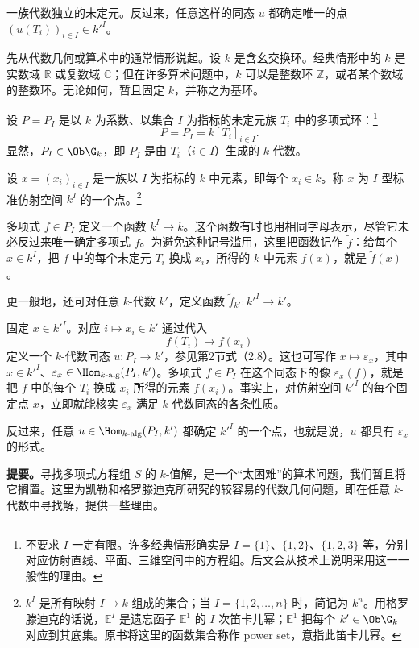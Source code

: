 一族代数独立的未定元。反过来，任意这样的同态 $u$ 都确定唯一的点 $(u(T_i))_{i\in I}\in k'^I$。

先从代数几何或算术中的通常情形说起。设 $k$ 是含幺交换环。经典情形中的 $k$ 是实数域 $\mathbb R$ 或复数域 $\mathbb C$；但在许多算术问题中，$k$ 可以是整数环 $\mathbb Z$，或者某个数域的整数环。无论如何，暂且固定 $k$，并称之为基环。

设 $P=P_I$ 是以 $k$ 为系数、以集合 $I$ 为指标的未定元族 $T_i$ 中的多项式环：\footnote{不要求 $I$ 一定有限。许多经典情形确实是 $I=\{1\}$、$\{1,2\}$、$\{1,2,3\}$ 等，分别对应仿射直线、平面、三维空间中的方程组。后文会从技术上说明采用这一一般性的理由。}
\[
P=P_I=k[T_i]_{i\in I}.\tag{3.1}
\]
显然，$P_I\in\Ob\G_k$，即 $P_I$ 是由 $T_i$（$i\in I$）生成的 $k$-代数。

设 $x=(x_i)_{i\in I}$ 是一族以 $I$ 为指标的 $k$ 中元素，即每个 $x_i\in k$。称 $x$ 为 $I$ 型标准仿射空间 $k^I$ 的一个点。\footnote{$k^I$ 是所有映射 $I\to k$ 组成的集合；当 $I=\{1,2,\ldots,n\}$ 时，简记为 $k^n$。用格罗滕迪克的话说，$\mathbb E^I$ 是遗忘函子 $\mathbb E^1$ 的 $I$ 次笛卡儿幂；$\mathbb E^1$ 把每个 $k'\in\Ob\G_k$ 对应到其底集。原书将这里的函数集合称作 power set，意指此笛卡儿幂。}

多项式 $f\in P_I$ 定义一个函数 $k^I\to k$。这个函数有时也用相同字母表示，尽管它未必反过来唯一确定多项式 $f$。为避免这种记号滥用，这里把函数记作 $\widetilde f$：给每个 $x\in k^I$，把 $f$ 中的每个未定元 $T_i$ 换成 $x_i$，所得的 $k$ 中元素 $f(x)$，就是 $\widetilde f(x)$。

更一般地，还可对任意 $k$-代数 $k'$，定义函数 $\widetilde f_{k'}:k'^I\to k'$。

固定 $x\in k'^I$。对应 $i\mapsto x_i\in k'$ 通过代入
\[
f(T_i)\longmapsto f(x_i)
\]
定义一个 $k$-代数同态 $u:P_I\to k'$，参见第2节式（2.8）。这也可写作 $x\mapsto\varepsilon_x$，其中 $x\in k'^I$、$\varepsilon_x\in\Hom_{k\text{-alg}}(P_I,k')$。多项式 $f\in P_I$ 在这个同态下的像 $\varepsilon_x(f)$，就是把 $f$ 中的每个 $T_i$ 换成 $x_i$ 所得的元素 $f(x_i)$。事实上，对仿射空间 $k'^I$ 的每个固定点 $x$，立即就能核实 $\varepsilon_x$ 满足 $k$-代数同态的各条性质。

反过来，任意 $u\in\Hom_{k\text{-alg}}(P_I,k')$ 都确定 $k'^I$ 的一个点，也就是说，$u$ 都具有 $\varepsilon_x$ 的形式。

\textbf{提要。}寻找多项式方程组 $S$ 的 $k$-值解，是一个“太困难”的算术问题，我们暂且将它搁置。这里为凯勒和格罗滕迪克所研究的较容易的代数几何问题，即在任意 $k$-代数中寻找解，提供一些理由。

